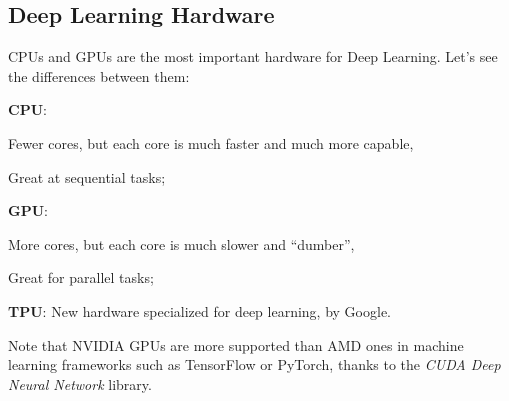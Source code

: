 \subsection{Deep Learning Hardware}\label{sec:dl-hw}

CPUs and GPUs are the most important hardware for Deep Learning. Let's see the differences between them:
\begin{myitem}
    \item \textbf{CPU}:
    \begin{myitem}
        \item Fewer cores, but each core is much faster and much more capable,
        \item Great at sequential tasks;
    \end{myitem}
    \item \textbf{GPU}:
    \begin{myitem}
        \item More cores, but each core is much slower and “dumber”,
        \item Great for parallel tasks;
    \end{myitem}
    \item \textbf{TPU}: New hardware specialized for deep learning, by Google.
\end{myitem}
Note that NVIDIA GPUs are more supported than AMD ones in machine learning frameworks such as TensorFlow or PyTorch, thanks to the \textit{CUDA Deep Neural Network} library.

